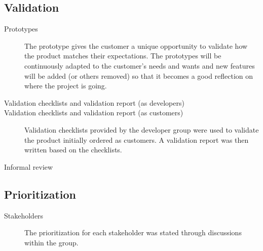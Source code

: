 \documentclass[10pt,a4paper]{article}
\begin{document}
\subsection{Validation}
\begin{description}
\item[Prototypes] The prototype gives the customer a unique opportunity to validate how the product matches their expectations. The prototypes will be continuously adapted to the customer's needs and wants and new features will be added (or others removed) so that it becomes a good reflection on where the project is going. 

\item[Validation checklists and validation report (as developers)]

\item[Validation checklists and validation report (as customers)] Validation checklists provided by the developer group were used to validate the product initially ordered as customers. A validation report was then written based on the checklists.

\item[Informal review]
\end{description}


\subsection{Prioritization}
\begin{description}
\item[Stakeholders] The prioritization for each stakeholder was stated through discussions within the group.  
\end{description}
\end{document}
